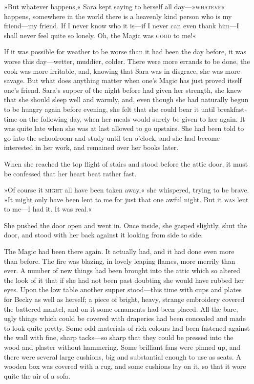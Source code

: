 »But whatever happens,« Sara kept saying to herself all day—»\textsc{whatever} happens, somewhere in the world there is a heavenly kind person who is my friend—my friend. If I never know who it is—if I never can even thank him—I shall never feel quite so lonely. Oh, the Magic was \textsc{good} to me!«

If it was possible for weather to be worse than it had been the day before, it was worse this day—wetter, muddier, colder. There were more errands to be done, the cook was more irritable, and, knowing that Sara was in disgrace, she was more savage. But what does anything matter when one's Magic has just proved itself one's friend. Sara's supper of the night before had given her strength, she knew that she should sleep well and warmly, and, even though she had naturally begun to be hungry again before evening, she felt that she could bear it until breakfast-time on the following day, when her meals would surely be given to her again. It was quite late when she was at last allowed to go upstairs. She had been told to go into the schoolroom and study until ten o'clock, and she had become interested in her work, and remained over her books later.

When she reached the top flight of stairs and stood before the attic door, it must be confessed that her heart beat rather fast.

»Of course it \textsc{might} all have been taken away,« she whispered, trying to be brave. »It might only have been lent to me for just that one awful night. But it \textsc{was} lent to me—I had it. It was real.«

She pushed the door open and went in. Once inside, she gasped slightly, shut the door, and stood with her back against it looking from side to side.

The Magic had been there again. It actually had, and it had done even more than before. The fire was blazing, in lovely leaping flames, more merrily than ever. A number of new things had been brought into the attic which so altered the look of it that if she had not been past doubting she would have rubbed her eyes. Upon the low table another supper stood—this time with cups and plates for Becky as well as herself; a piece of bright, heavy, strange embroidery covered the battered mantel, and on it some ornaments had been placed. All the bare, ugly things which could be covered with draperies had been concealed and made to look quite pretty. Some odd materials of rich colours had been fastened against the wall with fine, sharp tacks—so sharp that they could be pressed into the wood and plaster without hammering. Some brilliant fans were pinned up, and there were several large cushions, big and substantial enough to use as seats. A wooden box was covered with a rug, and some cushions lay on it, so that it wore quite the air of a sofa.

